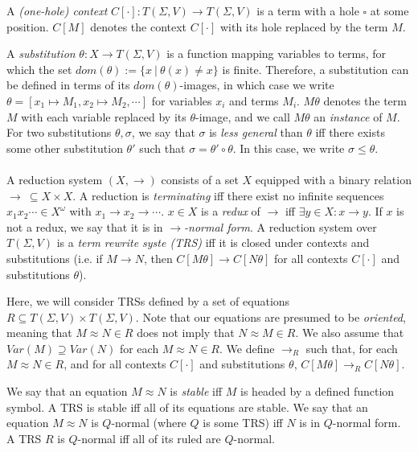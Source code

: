 \documentclass{article}
\begin{document}
A \emph{(one-hole) context} $C[\cdot] : T(\Sigma, V) \rightarrow T(\Sigma, V)$ is a term with a hole $\square$ at some position. $C[M]$ denotes the context $C[\cdot]$ with its hole replaced by the term $M$. 

A \emph{substitution} $\theta : X \rightarrow T(\Sigma, V)$ is a function mapping variables to terms, for which the set $dom(\theta) := \{ x ~|~ \theta(x) \neq x\}$ is finite. Therefore, a substitution can be defined in terms of its $dom(\theta)$-images, in which case we write $\theta = [x_1 \mapsto M_1, x_2 \mapsto M_2, \cdots]$ for variables $x_i$ and terms $M_i$. $M \theta$ denotes the term $M$ with each variable replaced by its $\theta$-image, and we call $M\theta$ an \emph{instance} of $M$. For two substitutions $\theta, \sigma$, we say that $\sigma$ is \emph{less general} than $\theta$ iff there exists some other substitution $\theta'$ such that $\sigma = \theta' \circ \theta$. In this case, we write $\sigma \leq \theta$. 
\\~\\
A reduction system $(X, \rightarrow)$ consists of a set $X$ equipped with a binary relation $\rightarrow ~\subseteq X \times X$. A reduction is \emph{terminating} iff there exist no infinite sequences $x_1x_2 \cdots \in X^\omega$ with $x_1 \rightarrow x_2 \rightarrow \cdots$. $x \in X$ is a \emph{redux} of $\rightarrow$ iff $\exists y \in X : x \rightarrow y$. If $x$ is not a redux, we say that it is in \emph{$\rightarrow$-normal form}. A reduction system over $T(\Sigma, V)$ is a \emph{term rewrite syste (TRS)} iff it is closed under contexts and substitutions (i.e. if $M \rightarrow N$, then $C[M\theta] \rightarrow C[N\theta]$ for all contexts $C[\cdot]$ and substitutions $\theta$). 

Here, we will consider TRSs defined by a set of equations $R \subseteq T(\Sigma, V) \times T(\Sigma, V)$. Note that our equations are presumed to be \emph{oriented}, meaning that $M \approx N \in R$ does not imply that $N \approx M \in R$. We also assume that $Var(M) \supseteq Var(N)$ for each $M \approx N \in R$. We define $\rightarrow_R$ such that, for each $M \approx N \in R$, and for all contexts $C[\cdot]$ and substitutions $\theta$, $C[M\theta] \rightarrow_R C[N\theta]$. 

We say that an equation $M \approx N$ is \emph{stable} iff $M$ is headed by a defined function symbol. A TRS is stable iff all of its equations are stable. We say that an equation $M \approx N$ is $Q$-normal (where $Q$ is some TRS) iff $N$ is in $Q$-normal form. A TRS $R$ is $Q$-normal iff all of its ruled are $Q$-normal.  
\end{document}
